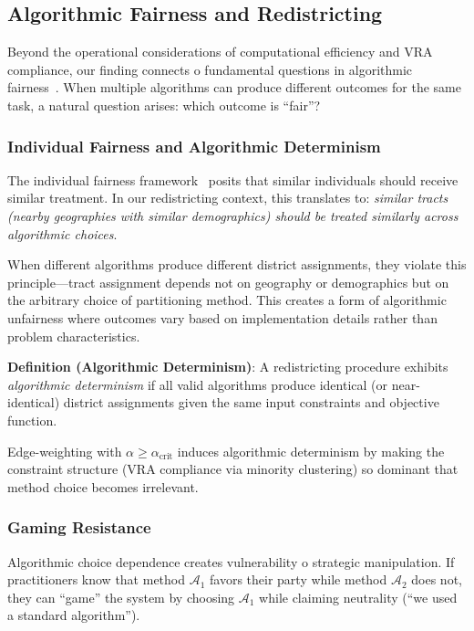\subsection{Algorithmic Fairness and Redistricting}
\label{sec:fairness-background}

Beyond the operational considerations of computational efficiency and VRA compliance, our finding connects 	o fundamental questions in algorithmic fairness~\cite{dwork2012fairness,hardt2016equality}. When multiple algorithms can produce different outcomes for the same task, a natural question arises: which outcome is ``fair''?

\subsubsection{Individual Fairness and Algorithmic Determinism}

The individual fairness framework~\cite{dwork2012fairness} posits that similar individuals should receive similar treatment. In our redistricting context, this translates to: \textit{similar tracts (nearby geographies with similar demographics) should be treated similarly across algorithmic choices}.

When different algorithms produce different district assignments, they violate this principle---tract assignment depends not on geography or demographics but on the arbitrary choice of partitioning method. This creates a form of algorithmic unfairness where outcomes vary based on implementation details rather than problem characteristics.

\textbf{Definition (Algorithmic Determinism)}: A redistricting procedure exhibits \textit{algorithmic determinism} if all valid algorithms produce identical (or near-identical) district assignments given the same input constraints and objective function.

Edge-weighting with $\alpha \geq \alpha_{\text{crit}}$ induces algorithmic determinism by making the constraint structure (VRA compliance via minority clustering) so dominant that method choice becomes irrelevant.

\subsubsection{Gaming Resistance}

Algorithmic choice dependence creates vulnerability 	o strategic manipulation. If practitioners know that method $\mathcal{A}_1$ favors their party while method $\mathcal{A}_2$ does not, they can ``game'' the system by choosing $\mathcal{A}_1$ while claiming neutrality (``we used a standard algorithm'').

